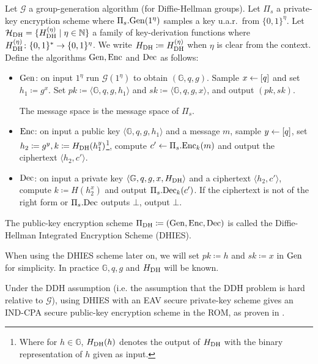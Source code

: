 \begin{definition}
	Let $\mathcal{G}$ a group-generation algorithm (for Diffie-Hellman groups). Let $\Pi_s$ a private-key encryption scheme where $\Pi_s.\mathrm{Gen}(1^\eta)$ samples a key u.a.r.\ from $\{0, 1\}^\eta$. Let $\mathcal{H}_\mathrm{DH} = \{H_\mathrm{DH}^{(\eta)} \mid \eta \in \mathbb{N} \}$ a family of key-derivation functions where $H_\mathrm{DH}^{(\eta)} \colon \{0, 1\}^* \to \{0, 1\}^{\eta}$. We write $H_\mathrm{DH} \coloneqq H_\mathrm{DH}^{(\eta)}$ when $\eta$ is clear from the context. Define the algorithms $\mathrm{Gen}, \mathrm{Enc}$ and $\mathrm{Dec}$ as follows:
	\begin{itemize}
		\item $\mathrm{Gen}$: on input $1^\eta$ run $\mathcal{G}(1^\eta)$ to obtain $(\mathbb{G}, q, g)$. Sample $x \leftarrow [q]$ and set $h_1 \coloneqq g^x$. Set $pk \coloneqq \langle \mathbb{G}, q, g, h_1 \rangle$ and $sk \coloneqq \langle \mathbb{G}, q, g, x \rangle$, and output $(pk, sk)$.

		      The message space is the message space of $\Pi_s$.
		\item $\mathrm{Enc}$: on input a public key $\langle \mathbb{G}, q, g, h_1 \rangle$ and a message $m$, sample $y \leftarrow [q]$, set $h_2 \coloneqq g^y, k \coloneqq H_\mathrm{DH}(h_1^y)$\footnote{Where for $h \in \mathbb{G}$, $H_\mathrm{DH}(h)$ denotes the output of $H_\mathrm{DH}$ with the binary representation of $h$ given as input.}, compute $c' \leftarrow \Pi_s.\mathrm{Enc}_k(m)$ and output the ciphertext $\langle h_2, c' \rangle$.
		\item $\mathrm{Dec}$: on input a private key $\langle \mathbb{G}, q, g, x, H_\mathrm{DH} \rangle$ and a ciphertext $\langle h_2, c' \rangle$, compute $k \coloneqq H(h_2^x)$ and output $\Pi_s.\mathrm{Dec}_k(c')$. If the ciphertext is not of the right form or $\Pi_s.\mathrm{Dec}$ outputs $\bot$, output $\bot$.
	\end{itemize}
	The public-key encryption scheme $\Pi_{\mathrm{DH}} \coloneqq (\mathrm{Gen}, \mathrm{Enc}, \mathrm{Dec})$ is called the Diffie-Hellman Integrated Encryption Scheme (DHIES).

	When using the DHIES scheme later on, we will set $pk \coloneqq h $ and $sk \coloneqq x$ in $\mathrm{Gen}$ for simplicity. In practice $\mathbb{G}, q, g$ and $H_\mathrm{DH}$ will be known.
\end{definition}

Under the DDH assumption (i.e. the assumption that the DDH problem is hard relative to $\mathcal{G}$), using DHIES with an EAV secure private-key scheme gives an IND-CPA secure public-key encryption scheme in the ROM, as proven in \cite[Theorem~12.12]{introduction-to-modern-cryptography}.
